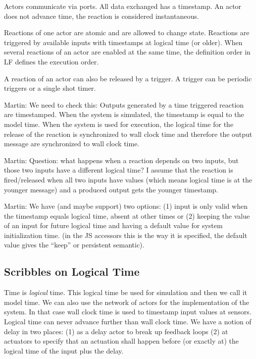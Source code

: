 \documentclass[sigconf]{acmart}
\newcommand{\martin}[1]{{\color{blue} Martin: #1}}
\begin{document}
Actors communicate via ports. All data exchanged has a timestamp.
An actor does not advance time, the reaction is considered instantaneous.

Reactions of one actor are atomic and are allowed to change state.
Reactions are triggered by available inputs with timestamps at logical
time (or older). When several reactions of an actor are enabled at the
same time, the definition order in LF defines the execution order.

A reaction of an actor can also be released by a trigger. A trigger
can be periodic triggers or a single shot timer.

\martin{We need to check this: Outputs generated by a time triggered
reaction are timestamped. When the system is simulated, the timestamp
is equal to the model time. When the system is used for execution, the logical
time for the release of the reaction is synchronized to wall clock time and therefore
the output message are synchronized to wall clock time.}

\martin{Question: what happens when a reaction depends on two inputs, but
those two inputs have a different logical time?
I assume that the reaction is fired/released when all two inputs have values
(which means logical time is at the younger message)
and a produced output gets the younger timestamp.}

\martin{We have (and maybe support) two options: (1) input is only valid when
the timestamp equals logical time, absent at other times or (2) keeping the value
of an input for future logical time and having a default value for system initialization time.
(in the JS accessors this is the way it is specified, the default value gives the
``keep'' or persistent semantic).}

\subsection{Scribbles on Logical Time}

Time is \emph{logical} time. This logical time be used for simulation and then
we call it model time. We can also use the network of actors for the implementation
of the system. In that case wall clock time is used to timestamp input values
at sensors. Logical time can never advance further than wall clock time.
We have a notion of delay in two places: (1) as a delay actor to break up
feedback loops (2) at actuators to specify that an actuation shall happen before
(or exactly at) the logical time of the input plus the delay.
\end{document}
